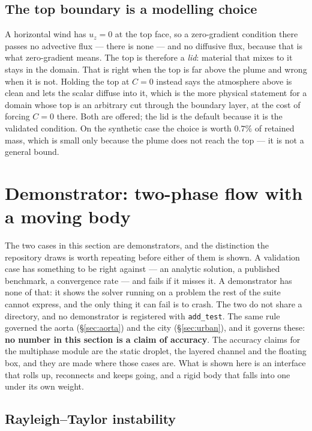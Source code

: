 \documentclass[11pt,a4paper]{article}
\newcommand{\code}[1]{\texttt{\small #1}}
\begin{document}
\subsection{The top boundary is a modelling choice}

A horizontal wind has $u_z = 0$ at the top face, so a zero-gradient condition
there passes no advective flux --- there is none --- and no diffusive flux,
because that is what zero-gradient means. The top is therefore a \emph{lid}:
material that mixes to it stays in the domain. That is right when the top is far
above the plume and wrong when it is not. Holding the top at $C=0$ instead says
the atmosphere above is clean and lets the scalar diffuse into it, which is the
more physical statement for a domain whose top is an arbitrary cut through the
boundary layer, at the cost of forcing $C=0$ there. Both are offered; the lid is
the default because it is the validated condition. On the synthetic case the
choice is worth $0.7\%$ of retained mass, which is small only because the plume
does not reach the top --- it is not a general bound.


\section{Demonstrator: two-phase flow with a moving body}
\label{sec:mpdemo}

The two cases in this section are demonstrators, and the distinction the
repository draws is worth repeating before either of them is shown. A validation
case has something to be right against --- an analytic solution, a published
benchmark, a convergence rate --- and fails if it misses it. A demonstrator has
none of that: it shows the solver running on a problem the rest of the suite
cannot express, and the only thing it can fail is to crash. The two do not share
a directory, and no demonstrator is registered with \code{add\_test}. The same
rule governed the aorta (\S\ref{sec:aorta}) and the city (\S\ref{sec:urban}),
and it governs these: \textbf{no number in this section is a claim of accuracy}.
The accuracy claims for the multiphase module are the static droplet, the
layered channel and the floating box, and they are made where those cases are.
What is shown here is an interface that rolls up, reconnects and keeps going,
and a rigid body that falls into one under its own weight.

\subsection{Rayleigh--Taylor instability}
\label{sec:rt}
\end{document}
